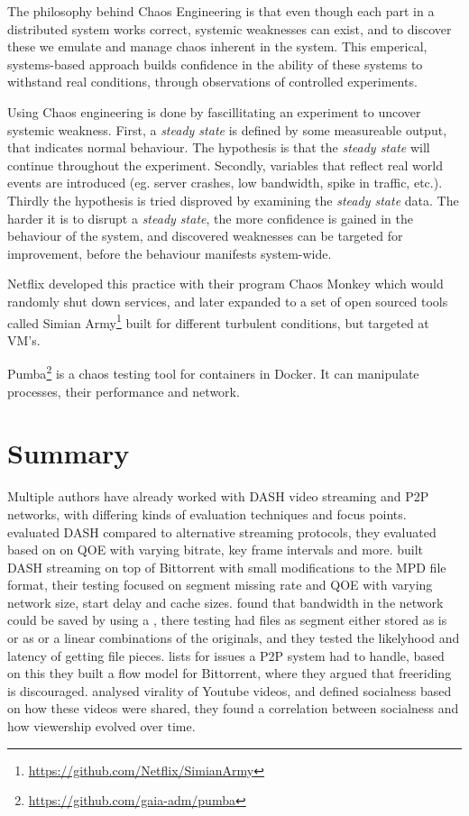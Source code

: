 The philosophy behind Chaos Engineering is that even though each part in a distributed system works correct, systemic weaknesses can exist, and to discover these we emulate and manage chaos inherent in the system. This emperical, systems-based approach builds confidence in the ability of these systems to withstand real conditions, through observations of controlled experiments.

Using Chaos engineering is done by fascillitating an experiment to uncover systemic weakness.
First, a \emph{steady state} is defined by some measureable output, that indicates normal behaviour. The hypothesis is that the \emph{steady state} will continue throughout the experiment.
Secondly, variables that reflect real world events are introduced (eg. server crashes, low bandwidth, spike in traffic, etc.).
Thirdly the hypothesis is tried disproved by examining the \emph{steady state} data.
The harder it is to disrupt a \emph{steady state}, the more confidence is gained in the behaviour of the system, and discovered weaknesses can be targeted for improvement, before the behaviour manifests system-wide.

Netflix developed this practice with their program Chaos Monkey which would randomly shut down services, and later expanded to a set of open sourced tools called Simian Army\footnote{\url{https://github.com/Netflix/SimianArmy}} built for different turbulent conditions, but targeted at \ac{VM}'s.

Pumba\footnote{\url{https://github.com/gaia-adm/pumba}} is a chaos testing tool for containers in Docker. It can manipulate processes, their performance and network.

\section{Summary}
Multiple authors have already worked with \ac{DASH} video streaming and \ac{P2P} networks, with differing kinds of evaluation techniques and focus points.\\
\citeauthor{aloman2015performance} evaluated \ac{DASH} compared to alternative streaming protocols, they evaluated based on on \ac{QOE} with varying bitrate, key frame intervals and more. \citeauthor{gazdar2017toward} built \ac{DASH} streaming on top of Bittorrent with small modifications to the \ac{MPD} file format, their testing focused on segment missing rate and \ac{QOE} with varying network size, start delay and cache sizes. \citeauthor{nguyen2009p2p} found that bandwidth in the network could be saved by using a \citeauthor{DHT}, there testing had files as segment either stored as is or as or a linear combinations of the originals, and they tested the likelyhood and latency of getting file pieces. \citeauthor{qiu2004modeling} lists for issues a \ac{P2P} system had to handle, based on this they built a flow model for Bittorrent, where they argued that freeriding is discouraged. \citeauthor{broxton2013catching} analysed virality of Youtube videos, and defined socialness based on how these videos were shared, they found a correlation between socialness and how viewership evolved over time.

